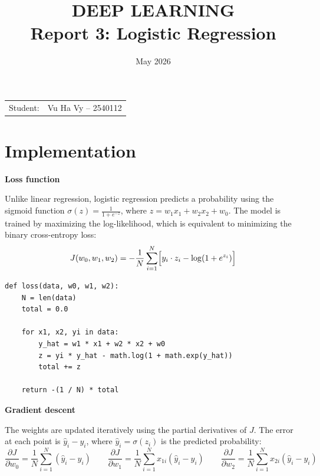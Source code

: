 \documentclass{article}
\title{\textbf{DEEP LEARNING} \\
{\Large \textbf{Report 3: Logistic Regression}}}
\date{May 2026}
\begin{document}
\pagestyle{plain}
\maketitle

\noindent\begin{tabular}{@{}ll}
  Student: & Vu Ha Vy -- 2540112 \\
\end{tabular}

\section*{Implementation}

\textbf{Loss function}

Unlike linear regression, logistic regression predicts a probability using
the sigmoid function $\sigma(z) = \frac{1}{1 + e^{-z}}$, where
$z = w_1 x_1 + w_2 x_2 + w_0$.
The model is trained by maximizing the log-likelihood, which is equivalent
to minimizing the binary cross-entropy loss:
\[
  J(w_0, w_1, w_2) = -\frac{1}{N} \sum_{i=1}^{N}
  \Bigl[ y_i \cdot z_i - \log(1 + e^{z_i}) \Bigr]
\]

\begin{verbatim}
def loss(data, w0, w1, w2):
    N = len(data)
    total = 0.0

    for x1, x2, yi in data:
        y_hat = w1 * x1 + w2 * x2 + w0
        z = yi * y_hat - math.log(1 + math.exp(y_hat))
        total += z

    return -(1 / N) * total
\end{verbatim}

\textbf{Gradient descent}

The weights are updated iteratively using the partial derivatives of $J$.
The error at each point is $\hat{y}_i - y_i$, where
$\hat{y}_i = \sigma(z_i)$ is the predicted probability:
\[
  \frac{\partial J}{\partial w_0} = \frac{1}{N}\sum_{i=1}^{N}(\hat{y}_i - y_i)
  \qquad
  \frac{\partial J}{\partial w_1} = \frac{1}{N}\sum_{i=1}^{N} x_{1i}(\hat{y}_i - y_i)
  \qquad
  \frac{\partial J}{\partial w_2} = \frac{1}{N}\sum_{i=1}^{N} x_{2i}(\hat{y}_i - y_i)
\]
\end{document}
